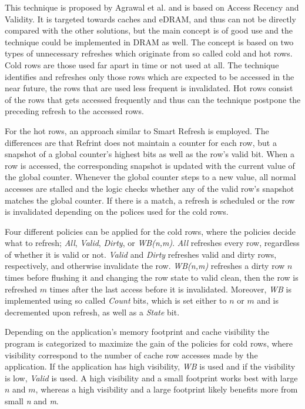 This technique is proposed by Agrawal et al. \cite{refrint} and is based on Access Recency and Validity. It is targeted towards caches and eDRAM, and thus can not be directly compared with the other solutions, but the main concept is of good use and the technique could be implemented in DRAM as well. The concept is based on two types of unnecessary refreshes which originate from so called cold and hot rows. Cold rows are those used far apart in time or not used at all. The technique identifies and refreshes only those rows which are expected to be accessed in the near future, the rows that are used less frequent is invalidated. Hot rows consist of the rows that gets accessed frequently and thus can the technique postpone the preceding refresh to the accessed rows.

For the hot rows, an approach similar to Smart Refresh is employed. The differences are that Refrint does not maintain a counter for each row, but a snapshot of a global counter's highest bits as well as the row's valid bit. When a row is accessed, the corresponding snapshot is updated with the current value of the global counter. Whenever the global counter steps to a new value, all normal accesses are stalled and the logic checks whether any of the valid row's snapshot matches the global counter. If there is a match, a refresh is scheduled or the row is invalidated depending on the polices used for the cold rows. 

Four different policies can be applied for the cold rows, where the policies decide what to refresh; \textit{All}, \textit{Valid}, \textit{Dirty}, or \textit{WB(n,m)}. \textit{All} refreshes every row, regardless of whether it is valid or not. \textit{Valid} and \textit{Dirty} refreshes valid and dirty rows, respectively, and otherwise invalidate the row. \textit{WB(n,m)} refreshes a dirty row $n$ times before flushing it and changing the row state to valid clean, then the row is refreshed $m$ times after the last access before it is invalidated. Moreover, \textit{WB} is implemented using so called \textit{Count} bits, which is set either to $n$ or $m$ and is decremented upon refresh, as well as a \textit{State} bit.

Depending on the application's memory footprint and cache visibility the program is categorized to maximize the gain of the policies for cold rows, where visibility correspond to the number of cache row accesses made by the application. If the application has high visibility, \textit{WB} is used and if the visibility is low, \textit{Valid} is used. A high visibility and a small footprint works best with large $n$ and $m$, whereas a high visibility and a large footprint likely benefits more from small \textit{n} and \textit{m}. 

